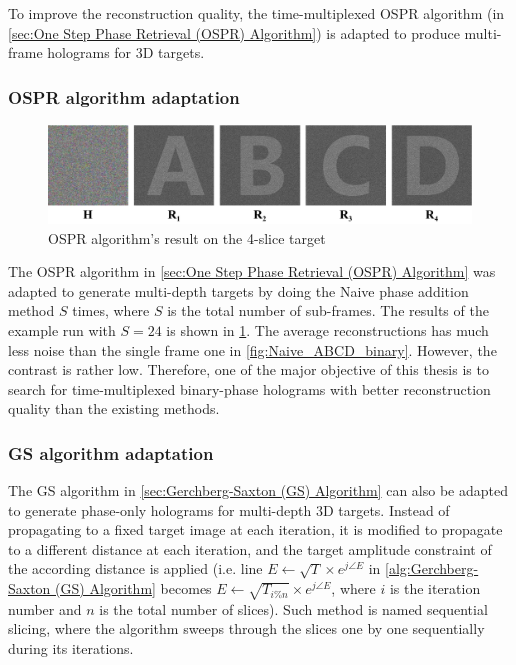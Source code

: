 To improve the reconstruction quality, the time-multiplexed OSPR algorithm (in \cref{sec:One Step Phase Retrieval (OSPR) Algorithm}) is adapted to produce multi-frame holograms for 3D targets.


\subsubsection{OSPR algorithm adaptation}
\begin{figure}[H]
	\centering
	\includegraphics[width=1.0\textwidth]{ABCD/OSPR_ABCD.pdf}
	\caption{OSPR algorithm's result on the 4-slice target}
	\label{fig:OSPR_ABCD}
\end{figure}

The OSPR algorithm in \cref{sec:One Step Phase Retrieval (OSPR) Algorithm} was adapted to generate multi-depth targets by doing the Naive phase addition method $S$ times, where $S$ is the total number of sub-frames. The results of the example run with $S=24$ is shown in \cref{fig:OSPR_ABCD}. The average reconstructions has much less noise than the single frame one in \cref{fig:Naive_ABCD_binary}. However, the contrast is rather low. Therefore, one of the major objective of this thesis is to search for time-multiplexed binary-phase holograms with better reconstruction quality than the existing methods.

\subsubsection{GS algorithm adaptation}
The GS algorithm in \cref{sec:Gerchberg-Saxton (GS) Algorithm} can also be adapted to generate phase-only holograms for multi-depth 3D targets. Instead of propagating to a fixed target image at each iteration, it is modified to propagate to a different distance at each iteration, and the target amplitude constraint of the according distance is applied (i.e. line $E \gets \sqrt{T} \times e^{j\angle E}$ in \cref{alg:Gerchberg-Saxton (GS) Algorithm} becomes $E \gets \sqrt{T_{i\%n}} \times e^{j\angle E}$, where $i$ is the iteration number and $n$ is the total number of slices). Such method is named sequential slicing, where the algorithm sweeps through the slices one by one sequentially during its iterations.

